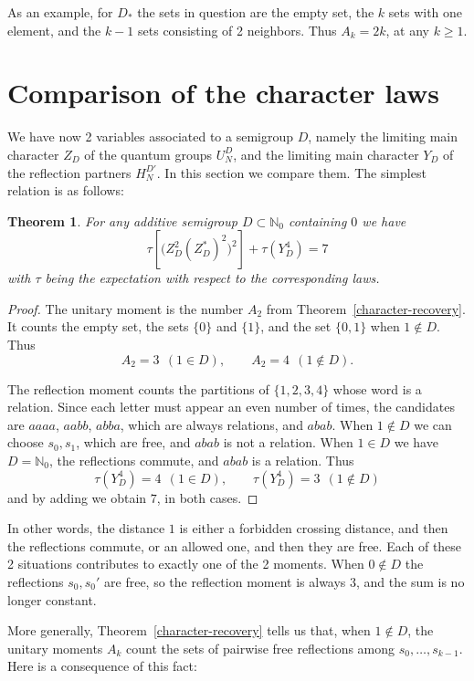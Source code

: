 \documentclass[11pt,a4paper]{article}
\newtheorem{thm}{Theorem}[section]
\begin{document}
As an example, for $D_*$ the sets in question are the empty set, the $k$ sets with one element, and the $k-1$ sets consisting of 2 neighbors. Thus $A_k=2k$, at any $k\geq1$.

\section{Comparison of the character laws}\label{paired-laws}

We have now 2 variables associated to a semigroup $D$, namely the limiting main character $Z_D$ of the quantum groups $U_N^D$, and the limiting main character $Y_D$ of the reflection partners $H_N^{D'}$. In this section we compare them. The simplest relation is as follows:

\begin{thm}\label{seven}
For any additive semigroup $D\subset\mathbb N_0$ containing $0$ we have
\[
 \tau\!\left[\bigl(Z_D^2(Z_D^*)^2\bigr)^2\right]+\tau(Y_D^4)=7
\]
with $\tau$ being the expectation with respect to the corresponding laws.
\end{thm}

\begin{proof}
The unitary moment is the number $A_2$ from Theorem~\ref{character-recovery}. It counts the empty set, the sets $\{0\}$ and $\{1\}$, and the set $\{0,1\}$ when $1\notin D$. Thus
\[
 A_2=3\ \ (1\in D),\qquad A_2=4\ \ (1\notin D).
\]

The reflection moment counts the partitions of $\{1,2,3,4\}$ whose word is a relation. Since each letter must appear an even number of times, the candidates are $aaaa$, $aabb$, $abba$, which are always relations, and $abab$. When $1\notin D$ we can choose $s_0,s_1$, which are free, and $abab$ is not a relation. When $1\in D$ we have $D=\mathbb N_0$, the reflections commute, and $abab$ is a relation. Thus
\[
 \tau(Y_D^4)=4\ \ (1\in D),\qquad\tau(Y_D^4)=3\ \ (1\notin D)
\]
and by adding we obtain $7$, in both cases.
\end{proof}

In other words, the distance $1$ is either a forbidden crossing distance, and then the reflections commute, or an allowed one, and then they are free. Each of these 2 situations contributes to exactly one of the 2 moments. When $0\notin D$ the reflections $s_0,s_0'$ are free, so the reflection moment is always $3$, and the sum is no longer constant.

More generally, Theorem~\ref{character-recovery} tells us that, when $1\notin D$, the unitary moments $A_k$ count the sets of pairwise free reflections among $s_0,\ldots,s_{k-1}$. Here is a consequence of this fact:
\end{document}
